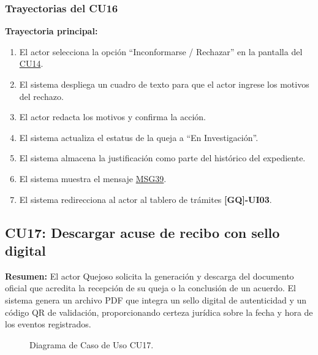 \begin{appendices}
\subsubsection{Trayectorias del CU16}
\textbf{Trayectoria principal:}
\begin{enumerate}[nosep]
    \item El actor selecciona la opción ``Inconformarse / Rechazar'' en la pantalla del \hyperlink{anexo:casos_uso}{CU14}.
    \item El sistema despliega un cuadro de texto para que el actor ingrese los motivos del rechazo.
    \item El actor redacta los motivos y confirma la acción.
    \item El sistema actualiza el estatus de la queja a ``En Investigación''.
    \item El sistema almacena la justificación como parte del histórico del expediente.
    \item El sistema muestra el mensaje \hyperlink{msg:MSG39}{MSG39}.
    \item El sistema redirecciona al actor al tablero de trámites \textbf{[GQ]-UI03}.
\end{enumerate}

\newpage

\subsection{CU17: Descargar acuse de recibo con sello digital}

\textbf{Resumen:} 
El actor Quejoso solicita la generación y descarga del documento oficial que acredita la recepción de su queja o la conclusión de un acuerdo. El sistema genera un archivo PDF que integra un sello digital de autenticidad y un código QR de validación, proporcionando certeza jurídica sobre la fecha y hora de los eventos registrados.

\begin{figure}[htbp]
    \centering
    \figCUdiecisiete
    \caption{Diagrama de Caso de Uso CU17.}
    \label{fig:cu17}
\end{figure}


\end{appendices}
